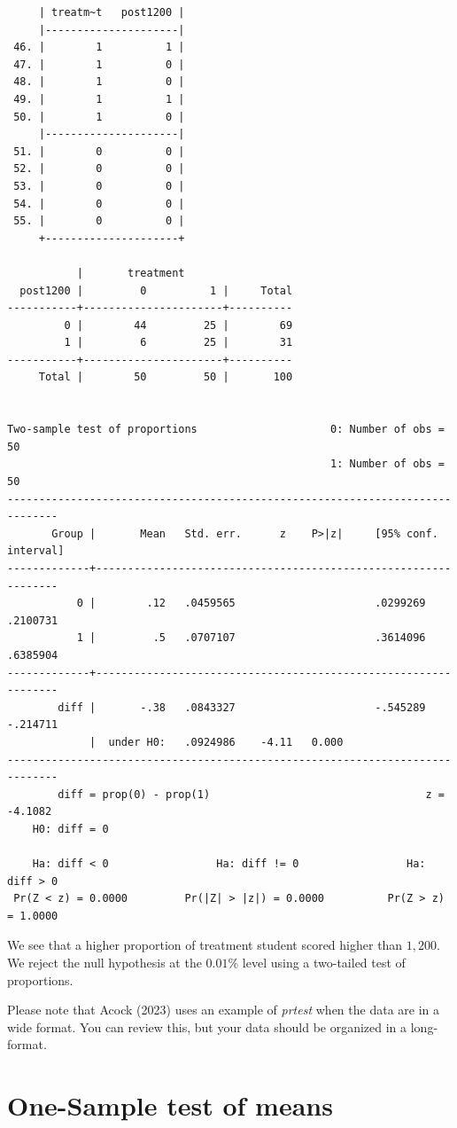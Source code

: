 \documentclass[
]{book}
\begin{document}
\begin{verbatim}
     | treatm~t   post1200 |
     |---------------------|
 46. |        1          1 |
 47. |        1          0 |
 48. |        1          0 |
 49. |        1          1 |
 50. |        1          0 |
     |---------------------|
 51. |        0          0 |
 52. |        0          0 |
 53. |        0          0 |
 54. |        0          0 |
 55. |        0          0 |
     +---------------------+

           |       treatment
  post1200 |         0          1 |     Total
-----------+----------------------+----------
         0 |        44         25 |        69 
         1 |         6         25 |        31 
-----------+----------------------+----------
     Total |        50         50 |       100 


Two-sample test of proportions                     0: Number of obs =       50
                                                   1: Number of obs =       50
------------------------------------------------------------------------------
       Group |       Mean   Std. err.      z    P>|z|     [95% conf. interval]
-------------+----------------------------------------------------------------
           0 |        .12   .0459565                      .0299269    .2100731
           1 |         .5   .0707107                      .3614096    .6385904
-------------+----------------------------------------------------------------
        diff |       -.38   .0843327                      -.545289    -.214711
             |  under H0:   .0924986    -4.11   0.000
------------------------------------------------------------------------------
        diff = prop(0) - prop(1)                                  z =  -4.1082
    H0: diff = 0

    Ha: diff < 0                 Ha: diff != 0                 Ha: diff > 0
 Pr(Z < z) = 0.0000         Pr(|Z| > |z|) = 0.0000          Pr(Z > z) = 1.0000
\end{verbatim}

We see that a higher proportion of treatment student scored higher than \(1,200\). We reject the null hypothesis at the \(0.01\%\) level using a two-tailed test of proportions.

Please note that Acock (2023) uses an example of \emph{prtest} when the data are in a wide format. You can review this, but your data should be organized in a long-format.

\section{One-Sample test of means}\label{one-sample-test-of-means}
\end{document}
